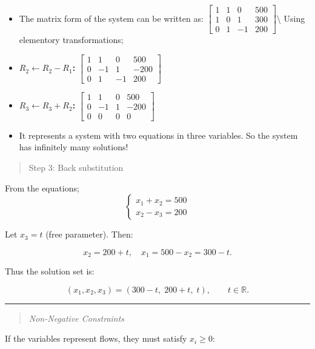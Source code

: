\documentclass[
  letterpaper,
  DIV=11,
  numbers=noendperiod]{scrreprt}
\begin{document}
\begin{itemize}
\item
  The matrix form of the system can be written as:
  \(\left[ \begin{array}{ccc|c} 1 & 1 & 0 & 500 \\ 1 & 0 & 1 & 300 \\ 0 & 1 & -1 & 200 \end{array} \right]\)\textbackslash{}
  Using elementory transformations;
\item
  \textbf{\(R_2 \leftarrow R_2 - R_1\):}
  \(\left[ \begin{array}{ccc|c} 1 & 1 & 0 & 500 \\ 0 & -1 & 1 & -200 \\ 0 & 1 & -1 & 200 \end{array} \right]\)
\item
  \textbf{\(R_3 \leftarrow R_3 + R_2\):}
  \(\left[ \begin{array}{ccc|c} 1 & 1 & 0 & 500 \\ 0 & -1 & 1 & -200 \\ 0 & 0 & 0 & 0 \end{array} \right]\)
\item
  It represents a system with two equations in three variables. So the
  system has infinitely many solutions!
\end{itemize}

\begin{quote}
Step 3: Back substitution
\end{quote}

From the equations; \[
\begin{cases}
x_1 + x_2 = 500 \\
x_2 - x_3 = 200
\end{cases}
\]

Let \(x_3 = t\) (free parameter). Then:

\[
x_2 = 200 + t, \quad 
x_1 = 500 - x_2 = 300 - t.
\]

Thus the solution set is:

\[
(x_1, x_2, x_3) = (300 - t,\; 200 + t,\; t), \qquad t \in \mathbb{R}.
\]

\begin{center}\rule{0.5\linewidth}{0.5pt}\end{center}

\begin{quote}
\emph{Non-Negative Constraints}
\end{quote}

If the variables represent flows, they must satisfy \(x_i \geq 0\):
\end{document}
